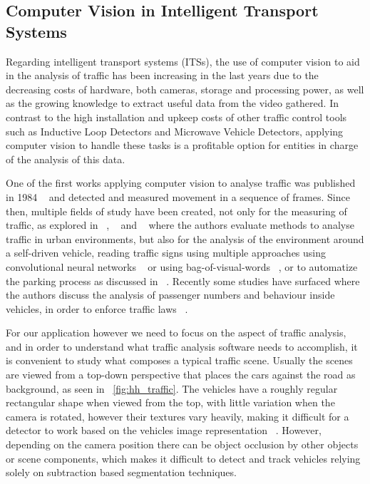 \subsection{Computer Vision in Intelligent Transport Systems}

Regarding intelligent transport systems (ITSs), the use of computer vision to aid in the analysis of traffic has been increasing in the last years due to the decreasing costs of hardware, both cameras, storage and processing power, as well as the growing knowledge to extract useful data from the video gathered. In contrast to the high installation and upkeep costs of other traffic control tools such as Inductive Loop Detectors and Microwave Vehicle Detectors, applying computer vision to handle these tasks is a profitable option for entities in charge of the analysis of this data.

One of the first works applying computer vision to analyse traffic was published in 1984 ~\cite{dickinson_image_1984} and detected and measured movement in a sequence of frames. Since then, multiple fields of study have been created, not only for the measuring of traffic, as explored in ~\cite{lira_computer-vision_2016}, ~\cite{buch_review_2011-1} and ~\cite{hashmi_analysis_2012} where the authors evaluate methods to analyse traffic in urban environments, but also for the analysis of the environment around a self-driven vehicle, reading traffic signs using multiple approaches using convolutional neural networks ~\cite{soendoro_traffic_2011} or using bag-of-visual-words ~\cite{supriyanto_unsupervised_2016}, or to automatize the parking process as discussed in ~\cite{hammoudi_self-driven_2016}. Recently some studies have surfaced where the authors discuss the analysis of passenger numbers and behaviour inside vehicles, in order to enforce traffic laws ~\cite{loce_detection_2017-1}.

For our application however we need to focus on the aspect of traffic analysis, and in order to understand what traffic analysis software needs to accomplish, it is convenient to study what composes a typical traffic scene. Usually the scenes are viewed from a top-down perspective that places the cars against the road as background, as seen in ~\ref{fig:hh_traffic}. The vehicles have a roughly regular rectangular shape when viewed from the top, with little variation when the camera is rotated, however their textures vary heavily, making it difficult for a detector to work based on the vehicles image representation ~\cite{badenas_applying_1998}. However, depending on the camera position there can be object occlusion by other objects or scene components, which makes it difficult to detect and track vehicles relying solely on subtraction based segmentation techniques.

